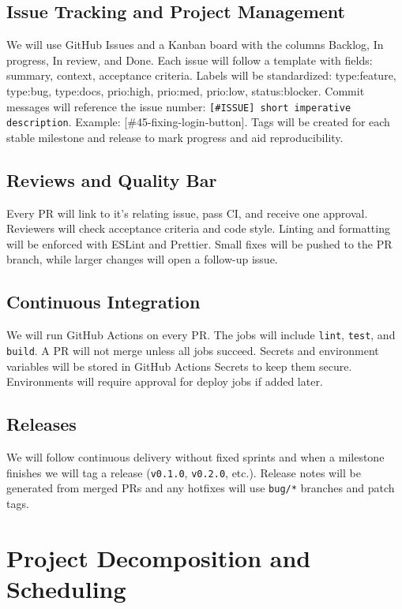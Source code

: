 \documentclass{article}
\begin{document}
\subsection*{Issue Tracking and Project Management}
We will use GitHub Issues and a Kanban board with the columns Backlog, In progress, In review, and Done. Each issue will follow a template with fields: summary, context, acceptance criteria. Labels will be standardized: type:feature, type:bug, type:docs, prio:high, prio:med, prio:low, status:blocker. Commit messages will reference the issue number: \texttt{[\#ISSUE] short imperative description}. Example: [\#45-fixing-login-button]. Tags will be created for each stable milestone and release to mark progress and aid reproducibility.

\subsection*{Reviews and Quality Bar}
Every PR will link to it's relating issue, pass CI, and receive one approval. Reviewers will check acceptance criteria and code style. Linting and formatting will be enforced with ESLint and Prettier. Small fixes will be pushed to the PR branch, while larger changes will open a follow-up issue.

\subsection*{Continuous Integration}
We will run GitHub Actions on every PR. The jobs will include \texttt{lint}, \texttt{test}, and \texttt{build}. A PR will not merge unless all jobs succeed. Secrets and environment variables will be stored in GitHub Actions Secrets to keep them secure. Environments will require approval for deploy jobs if added later.

\subsection*{Releases}
We will follow continuous delivery without fixed sprints and when a milestone finishes we will tag a release (\texttt{v0.1.0}, \texttt{v0.2.0}, etc.). Release notes will be generated from merged PRs and any hotfixes will use \texttt{bug/*} branches and patch tags.

\section{Project Decomposition and Scheduling}
\end{document}
